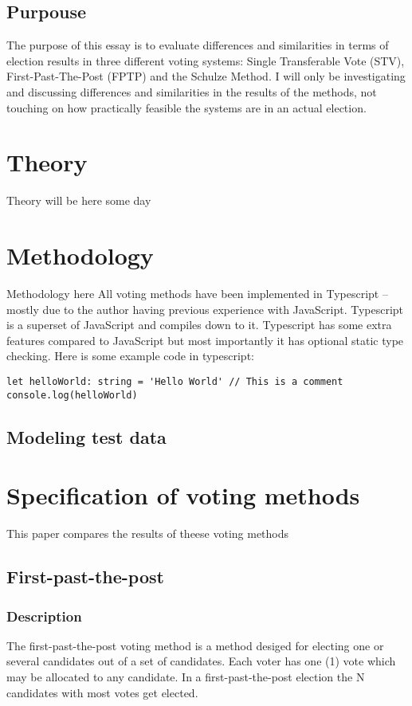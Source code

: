 \subsection{Purpouse}
The purpose of this essay is to evaluate differences and similarities in terms of election results in three different voting systems: Single Transferable Vote (STV), First-Past-The-Post (FPTP) and the Schulze Method. I will only be investigating and discussing differences and similarities in the results of the methods, not touching on how practically feasible the systems are in an actual election.
\pagebreak
\section{Theory}
Theory will be here some day
\section{Methodology}
Methodology here
All voting methods have been implemented in Typescript – mostly due to the author having previous experience with JavaScript. Typescript is a superset of JavaScript and compiles down to it. Typescript has some extra features compared to JavaScript but most importantly it has optional static type checking. Here is some example code in typescript:
\begin{lstlisting}
let helloWorld: string = 'Hello World' // This is a comment
console.log(helloWorld)
\end{lstlisting}
\subsection{Modeling test data}
\pagebreak
\section{Specification of voting methods}
This paper compares the results of theese voting methods
\subsection{First-past-the-post}
\subsubsection{Description}
The first-past-the-post voting method is a method desiged for electing one or several candidates out of a set of candidates. Each voter has one (1) vote which may be allocated to any candidate. In a first-past-the-post election the N candidates with most votes get elected.
